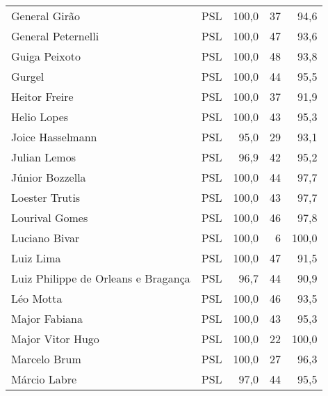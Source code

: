 \begin{longtable}{llrrr}
                       General Girão &            PSL &     100,0 &           37 &       94,6 \\
                  General Peternelli &            PSL &     100,0 &           47 &       93,6 \\
                       Guiga Peixoto &            PSL &     100,0 &           48 &       93,8 \\
                              Gurgel &            PSL &     100,0 &           44 &       95,5 \\
                       Heitor Freire &            PSL &     100,0 &           37 &       91,9 \\
                         Helio Lopes &            PSL &     100,0 &           43 &       95,3 \\
                    Joice Hasselmann &            PSL &      95,0 &           29 &       93,1 \\
                        Julian Lemos &            PSL &      96,9 &           42 &       95,2 \\
                     Júnior Bozzella &            PSL &     100,0 &           44 &       97,7 \\
                      Loester Trutis &            PSL &     100,0 &           43 &       97,7 \\
                      Lourival Gomes &            PSL &     100,0 &           46 &       97,8 \\
                       Luciano Bivar &            PSL &     100,0 &            6 &      100,0 \\
                           Luiz Lima &            PSL &     100,0 &           47 &       91,5 \\
 Luiz Philippe de Orleans e Bragança &            PSL &      96,7 &           44 &       90,9 \\
                           Léo Motta &            PSL &     100,0 &           46 &       93,5 \\
                       Major Fabiana &            PSL &     100,0 &           43 &       95,3 \\
                    Major Vitor Hugo &            PSL &     100,0 &           22 &      100,0 \\
                        Marcelo Brum &            PSL &     100,0 &           27 &       96,3 \\
                        Márcio Labre &            PSL &      97,0 &           44 &       95,5 \\

\end{longtable}
